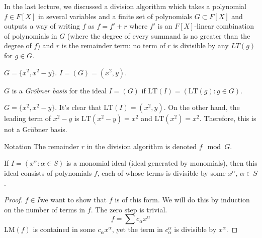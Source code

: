 \documentclass[a4paper,twoside,master.tex]{subfiles}
\begin{document}

In the last lecture, we discussed a division algorithm which takes a polynomial $ f \in F[X] $ in several variables and a finite set of polynomials $ G\subset F[X] $ and outputs a way of writing $ f $ as $ f = f' + r $ where $ f' $ is an $ F[X] $-linear combination of polynomials in $ G $ (where the degree of every summand is no greater than the degree of $ f $) and $ r $ is the remainder term: no term of $ r $ is divisible by any $ LT(g) $ for $ g \in G $.

\begin{ex}
    $ G = \{x^2, x^2 - y\} $. $ I = (G) = (x^2, y) $.
\end{ex}

\begin{definition}
    $ G $ is a \textit{Gr\"obner basis} for the ideal $ I = (G) $ if $ \text{LT}(I) = (\text{LT}(g) \colon g \in G) $.
\end{definition}

\begin{ex}
    $ G = \{x^2, x^2 - y\} $. It's clear that $ \text{LT}(I) = (x^2, y) $. On the other hand, the leading term of $ x^2 - y $ is $ \text{LT}(x^2 - y) = x^2 $ and $ \text{LT}(x^2) = x^2 $. Therefore, this is not a Gr\"obner basis.
\end{ex}

\begin{note}{Notation}
    The remainder $ r $ in the division algorithm is denoted $ f\mod G $.
\end{note}

\begin{claim}
    If $ I = (x^{\alpha} \colon \alpha \in S) $ is a monomial ideal (ideal generated by monomials), then this ideal consists of polynomials $ f $, each of whose terms is divisible by some $ x^{\alpha} $, $ \alpha \in S $.
\end{claim}

\begin{proof}
    $ f \in I $\textemdash we want to show that $ f $ is of this form. We will do this by induction on the number of terms in $ f $. The zero step is trivial.
    \begin{equation}
        f = \sum c_{\alpha} x^{\alpha}
    \end{equation}
    $ \text{LM}(f) $ is contained in some $ c_{\alpha} x^{\alpha} $, yet the term in $ c_{\alpha}^{\alpha} $ is divisible by $ x^{\alpha} $.
\end{proof}
\end{document}
